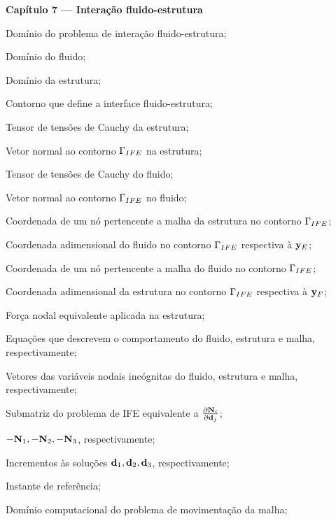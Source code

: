 \begin{simbolos}
   \vspace{0.5cm}
   \item[]\textbf{Capítulo 7 — Interação fluido-estrutura}
   \item[$\Omega_{IFE}$] Domínio do problema de interação fluido-estrutura;
   \item[$\Omega_{F}$] Domínio do fluido;
   \item[$\Omega_{E}$] Domínio da estrutura;
   \item[$\boundaryFSI$] Contorno que define a interface fluido-estrutura;
   \item[$\stressTensor_E$] Tensor de tensões de Cauchy da estrutura;
   \item[$\mathbf{n}_E$] Vetor normal ao contorno $\boundaryFSI$ na estrutura;
   \item[$\stressTensor_F$] Tensor de tensões de Cauchy do fluido;
   \item[$\mathbf{n}_F$] Vetor normal ao contorno $\boundaryFSI$ no fluido;
   \item[$\ePosition_E$] Coordenada de um nó pertencente a malha da estrutura no contorno $\boundaryFSI$;
   \item[$\adimensionalcoordinates_F(\ePosition_E)$] Coordenada adimensional do fluido no contorno $\boundaryFSI$ respectiva à $\ePosition_E$;
   \item[$\pos_F$] Coordenada de um nó pertencente a malha do fluido no contorno $\boundaryFSI$;
   \item[$\adimensionalcoordinates_E(\pos_F)$] Coordenada adimensional da estrutura no contorno $\boundaryFSI$ respectiva à $\pos_F$;
   \item[$\mathbf{t}_{E}$] Força nodal equivalente aplicada na estrutura;
   \item[$\Nf,\Ns,\Nm$] Equações que descrevem o comportamento do fluido, estrutura e malha, respectivamente;
   \item[$\df,\ds,\dm$] Vetores das variáveis nodais incógnitas do fluido, estrutura e malha, respectivamente;
   \item[$\mA_{ij}$] Submatriz do problema de IFE equivalente a $\frac{\partial\mathbf{N}_{i}}{\partial\mathbf{d}_{j}}$;
   \item[$\cff,\css,\cmm$] $-\mathbf{N}_{1},-\mathbf{N}_{2},-\mathbf{N}_{3}$, respectivamente;
   \item[$\xf$, $\xs$ e $\xm$] Incrementos às soluções $\df,\ds,\dm$, respectivamente;
   \item[$\tildet$] Instante de referência;
   \item[$\Omega$] Domínio computacional do problema de movimentação da malha;

\end{simbolos}
